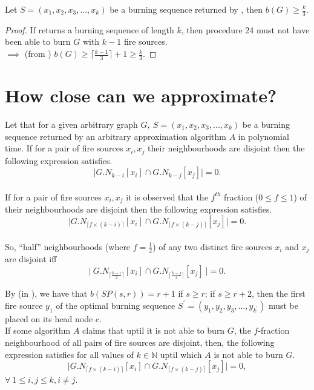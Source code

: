 \begin{theorem}\label{theorem:proof-3-approx}
Let $S = (x_1, x_2, x_3, . . ., x_k)$ be a burning sequence returned by , then $b(G) \geq \frac{k}{3}$.
\end{theorem}

\begin{proof}
If  returns a burning sequence of length $k$, then procedure 24 must not have been able to burn $G$ with $k-1$ fire sources.\\
$\implies$ (from ) $b(G) \geq \big\lceil \frac{k-1}{3}\big\rceil+1 \geq \frac{k}{3}$.
\end{proof}

\section{How close can we approximate?}\label{section:no-better-than-3-approx}

Let that for a given arbitrary graph $G,\ S = (x_1, x_2, x_3, . . ., x_k)$ be a burning sequence returned by an arbitrary approximation algorithm $A$ in polynomial time. If for a pair of fire sources $x_i, x_j$ their neighbourhoods are disjoint then the following expression satisfies.
$$\big | G.N_{k-i} [x_i] \cap G.N_{k-j}[x_j] \big | = 0.$$\\
If for a pair of fire sources $x_i, x_j$ it is observed that the $f^{th}$ fraction ($0 \leq f \leq 1$) of their neighbourhoods are disjoint then the following expression satisfies.
$$\big | G.N_{\lceil f \times (k-i) \rceil} [x_i] \cap G.N_{\lceil f \times (k-j)\rceil}[x_j] \big | = 0.$$\\
So, ``half'' neighbourhoods (where $f=\frac{1}{2}$) of any two distinct fire sources $x_i$ and $x_j$ are disjoint iff
$$\Big |\ G.N_{\big\lceil\frac{k-i}{2}\big\rceil}[x_i] \cap G.N_{\big\lceil\frac{k-j}{2}\big\rceil}[x_j]\ \Big | = 0.$$

By  (in ), we have that $b(SP(s, r)) = r+1$ if $s \geq r$; if $s \geq r+2$, then the first fire source $y_1$ of the optimal burning sequence $S^{\prime} = (y_1, y_2, y_3, . . ., y_{k^{\prime}})$ must be placed on its head node $c$.\\

If some algorithm $A$ claims that uptil it is not able to burn $G$, the $f$-fraction neighbourhood of all pairs of fire sources are disjoint, then, the following expression satisfies for all values of $k \in \mathbb{N}$ uptil which $A$ is not able to burn $G$.
$$\big | G.N_{\lceil f \times (k-i) \rceil} [x_i] \cap G.N_{\lceil f \times (k-j)\rceil}[x_j] \big | = 0,$$ $\forall\ 1 \leq i, j \leq k, i \neq j$.\\


